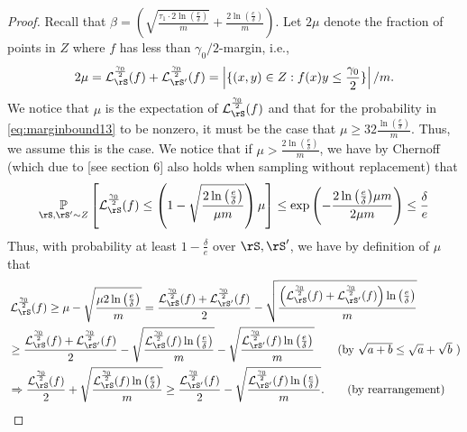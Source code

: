 \begin{proof}
   Recall that $ \beta=\left(\sqrt{\frac{\tau_{1}\cdot 2 \ln{\left(\frac{e}{\delta} \right)}}{m}} 
+\frac{2\ln{\left(\frac{e}{\delta} \right)}}{m}\right).$ Let $ 2\mu $  denote the fraction of points in $ Z $ where $ f $ has less than  $ \gamma_{0}/2 $-margin, i.e.,    
$$ 2\mu= \ls_{\rS}^{\frac{\gamma_{0}}{2}}(f)+\ls_{\rS'}^{\frac{\gamma_{0}}{2}}(f)= \left| \{ (x,y)\in Z: f(x)y\leq \frac{\gamma_0}{2} \} \right| /m. $$
We notice that $ \mu $ is the expectation of  $  \ls_{\rS}^{\frac{\gamma_{0}}{2}}(f)$ and that for the probability in \cref{eq:marginbound13} to be nonzero, it must be the case that $ \mu \geq 32\frac{\ln{\left(\frac{e}{\delta} \right)}}{m} $. Thus, we assume this is the case.
We notice that if $ \mu > \frac{2\ln{\left(\frac{e}{\delta} \right)}}{m}$, we have by Chernoff (which due to \cite{withreplacementchernoff}[see section 6] also holds when sampling without replacement) that  
\begin{align*}
    \p_{\rS,\rS'\sim Z}\left[\ls_{\rS}^{\frac{\gamma_{0}}{2}}(f)\leq \left(1-\sqrt{\frac{2\ln{\left(\frac{e}{\delta} \right)}}{\mu m}}\right)\mu \right]
    \leq  \exp{\left(-\frac{2\ln{\left(\frac{e}{\delta} \right)}\mu m}{2\mu m} \right)}\leq  \frac{\delta}{e}
\end{align*}
Thus, with probability at least $ 1-\frac{\delta}{e} $ over $ \rS,\rS' $, we have by definition of $ \mu $ that
\begin{align}\label{eq:marginbound7}
    &\ls_{\rS}^{\frac{\gamma_{0}}{2}}(f)
    \geq 
    \mu-\sqrt{\frac{\mu 2 \ln{\left(\frac{e}{\delta} \right)}}{m}}
    =
    \frac{\ls_{\rS}^{\frac{\gamma_{0}}{2}}(f)+\ls_{\rS'}^{\frac{\gamma_{0}}{2}}(f)}{2}-
\sqrt{\frac{\left(
    \ls_{\rS}^{\frac{\gamma_{0}}{2}}(f)+\ls_{\rS'}^{\frac{\gamma_{0}}{2}}(f)
    \right)\ln{\left(\frac{e}{\delta} \right)}}{m}}
    \\
    &\geq
    \frac{\ls_{\rS}^{\frac{\gamma_{0}}{2}}(f)+\ls_{\rS'}^{\frac{\gamma_{0}}{2}}(f)}{2}-
\sqrt{\frac{
    \ls_{\rS}^{\frac{\gamma_{0}}{2}}(f)
    \ln{\left(\frac{e}{\delta} \right)}}{m}}
    -
\sqrt{\frac{
    \ls_{\rS'}^{\frac{\gamma_{0}}{2}}(f)
    \ln{\left(\frac{e}{\delta} \right)}}{m}}
    \tag{by $ \sqrt{a+b}\leq \sqrt{a}+\sqrt{b} $ }
    \\
    &\Rightarrow
    \frac{\ls_{\rS}^{\frac{\gamma_{0}}{2}}(f)}{2}+
\sqrt{\frac{
    \ls_{\rS}^{\frac{\gamma_{0}}{2}}(f)
    \ln{\left(\frac{e}{\delta} \right)}}{m}}
\geq
\frac{\ls_{\rS'}^{\frac{\gamma_{0}}{2}}(f)}{2}-
\sqrt{\frac{
    \ls_{\rS'}^{\frac{\gamma_{0}}{2}}(f)
    \ln{\left(\frac{e}{\delta} \right)}}{m}}.
    \tag{by rearrangement}

\end{align}
\end{proof}
